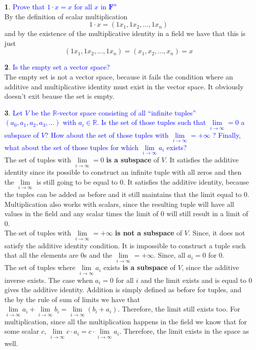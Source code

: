 \documentclass[10pt, twocolumn]{article}
\newcommand{\question}[1]{\textcolor{blue}{#1} \\}
\newcommand{\R}{\mathbb{R}}
\theoremstyle{definition}
\newtheorem{q}{}
\begin{document}
\begin{q}
    \question{Prove that $ 1 \cdot x = x $ for all $ x $ in $ \textbf{F}^n $} 
    By the definition of scalar multiplication $$ 1 \cdot x = (1x_1, 1x_2, ..., 1x_n) $$
    and by the existence of the multiplicative identity in a field we have that this is just
    $$ (1x_1, 1x_2, ..., 1x_n) = (x_1, x_2, ..., x_n) = x $$
\end{q}
\begin{q}
    \question{Is the empty set a vector space?} 
    The empty set is not a vector space, because it fails the condition where an additive and multiplicative identity must exist in the vector space.
    It obviously doesn't exit beause the set is empty.
\end{q}
\begin{q}
    \question{
        Let $ V $ be the $\R$-vector space consisting of all “infinite tuples” $(a_0, a_1, a_2, a_3, . . .)$ with $ a_i \in \R $.  
        Is the set of those tuples such that  $ \lim \limits_{i \rightarrow \infty} = 0 $ a subspace of $V $? 
        How about the set of those tuples with $ \lim \limits_{i \rightarrow \infty} = +\infty $ ? 
        Finally,  what about the set of those tuples for which  $ \lim \limits_{i \rightarrow \infty} a_i $ exists?
    } 
    The set of tuples with $\lim \limits_{i \rightarrow \infty} = 0 $  \textbf{is a subspace} of  $ V $. 
    It satisfies the additive identity since its possible to construct an infinite tuple with all zeros and then the $ \lim \limits_{i \rightarrow \infty} $ is still going to be equal to 0. 
    It satisfies the additive identity, because the tuples can be added as before and it still maintains that the limit equal to 0.
    Multiplication also works with scalars, since the resulting tuple will have all values in the field and any scalar times the limit of 0 will still result in a limit of 0. \\
    The set of tuples with  $ \lim \limits_{i \rightarrow \infty} = +\infty $ \textbf{is not a subspace} of $ V $. Since, it does not satisfy the additive identity condition. 
    It is impossible to construct a tuple such that all the elements are 0s and the $ \lim \limits_{i \rightarrow \infty} = +\infty $. Since, all $ a_i = 0 $ for 0. \\
    The set of tuples where $ \lim \limits_{i \rightarrow \infty} a_i $ exists \textbf{is a subspace} of $ V $, since the additive inverse exists.
    The case when $ a_i = 0 $ for all $ i $ and the limit exists and is equal to 0 gives the additive identity. 
    Addition is simply defined as before for tuples, and the by the rule of sum of limits we have that $ \lim \limits_{i \rightarrow \infty} a_i + \lim \limits_{i \rightarrow \infty} b_i = \lim \limits_{i \rightarrow \infty} (b_i + a_i) $.
    Therefore, the limit still exists too. For multiplication, since all the multiplication happens in the field we know that for some scalar $ c $,  $ \lim \limits_{i \rightarrow \infty} c \cdot a_i = c \cdot \lim \limits_{i \rightarrow \infty}  a_i $.
    Therefore, the limit exists in the space as well. 
\end{q}
\end{document}
